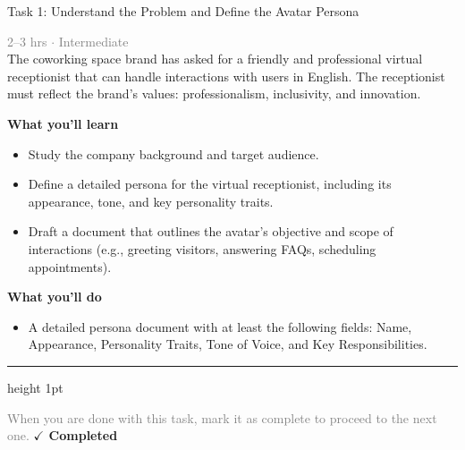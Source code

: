 \documentclass[10pt,a4paper]{article}
\begin{document}
\begin{taskbox}{Task 1: Understand the Problem and Define the Avatar Persona}

    {\small \textcolor{gray}{2--3 hrs $\cdot$ Intermediate}}\\[12pt]

      
The coworking space brand has asked for a friendly and professional virtual receptionist that can handle interactions with users in English. The receptionist must reflect the brand’s values: professionalism, inclusivity, and innovation.


\vspace{8pt}
{\large \textbf{\textcolor{brandLight}{What you'll learn}}}\\[4pt]  
\begin{itemize}
    \item Study the company background and target audience.  
    \item Define a detailed persona for the virtual receptionist, including its appearance, tone, and key personality traits.  
    \item Draft a document that outlines the avatar’s objective and scope of interactions (e.g., greeting visitors, answering FAQs, scheduling appointments).  
\end{itemize}

\vspace{8pt}
{\large \textbf{\textcolor{brandLight}{What you'll do}}}\\[4pt]  
\begin{itemize}
    \item A detailed persona document with at least the following fields: Name, Appearance, Personality Traits, Tone of Voice, and Key Responsibilities.\par
\end{itemize}

    \vspace{16pt}

    \textcolor{cardBorder}{\hrule height 1pt}\vspace{8pt}

    \small \textcolor{gray}{When you are done with this task, mark it as complete to proceed to the next one.} \hfill \textbf{\textcolor{brandDark}{$\checkmark$ Completed}}

\end{taskbox}
\end{document}
